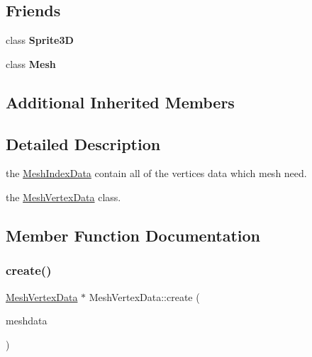 \subsection*{Friends}
\begin{DoxyCompactItemize}
\item 
\mbox{\label{classMeshVertexData_af6c4966aafabcc15b700aea1c2e12528}} 
class {\bfseries Sprite3D}
\item 
\mbox{\label{classMeshVertexData_ac9b3996998332cf8a503b4fbcaa6b200}} 
class {\bfseries Mesh}
\end{DoxyCompactItemize}
\subsection*{Additional Inherited Members}


\subsection{Detailed Description}
the \hyperlink{classMeshIndexData}{Mesh\+Index\+Data} contain all of the vertices data which mesh need. 

the \hyperlink{classMeshVertexData}{Mesh\+Vertex\+Data} class. 

\subsection{Member Function Documentation}
\mbox{\label{classMeshVertexData_a652f988804e74dd1af705ffc24147ea0}} 
\subsubsection{\texorpdfstring{create()}{create()}\hspace{0.1cm}{\footnotesize\ttfamily [1/2]}}
{\footnotesize\ttfamily \hyperlink{classMeshVertexData}{Mesh\+Vertex\+Data} $\ast$ Mesh\+Vertex\+Data\+::create (\begin{DoxyParamCaption}\item[{const \hyperlink{structMeshData}{Mesh\+Data} \&}]{meshdata }\end{DoxyParamCaption})\hspace{0.3cm}{\ttfamily [static]}}

